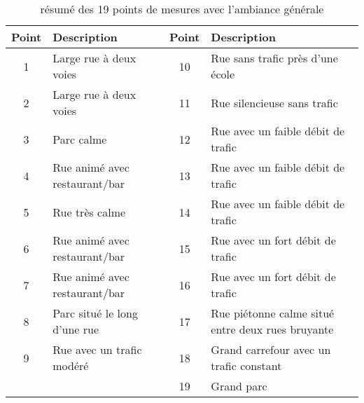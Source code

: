 \begin{table}[h]
\centering

\begin{tabular}{|c|p{6cm}||c|p{6cm}|}
\hline
\textbf{Point} & \textbf{Description  }                 & \textbf{Point} & \textbf{Description                                      } \\ \hline
1     & Large rue à deux voies        & 10    & Rue sans trafic près d’une école                  \\ \hline
2     & Large rue à deux voies        & 11    & Rue silencieuse sans trafic                       \\ \hline
3     & Parc calme                    & 12    & Rue avec un faible débit de trafic                \\ \hline
4     & Rue animé avec restaurant/bar & 13    & Rue avec un faible débit de trafic                \\ \hline
5     & Rue très calme                & 14    & Rue avec un faible débit de trafic                \\ \hline
6     & Rue animé avec restaurant/bar & 15    & Rue avec un fort débit de trafic                  \\ \hline
7     & Rue animé avec restaurant/bar & 16    & Rue avec un fort débit de trafic                  \\ \hline
8     & Parc situé le long d’une rue  & 17    & Rue piétonne calme situé entre deux rues bruyante \\ \hline
9     & Rue avec un trafic modéré     & 18    & Grand carrefour avec un trafic constant           \\ \hline
      &                               & 19    & Grand parc                                        \\ \hline
\end{tabular}
\caption{résumé des 19 points de mesures avec l'ambiance générale}
\label{tab:resume19pts}
\end{table}